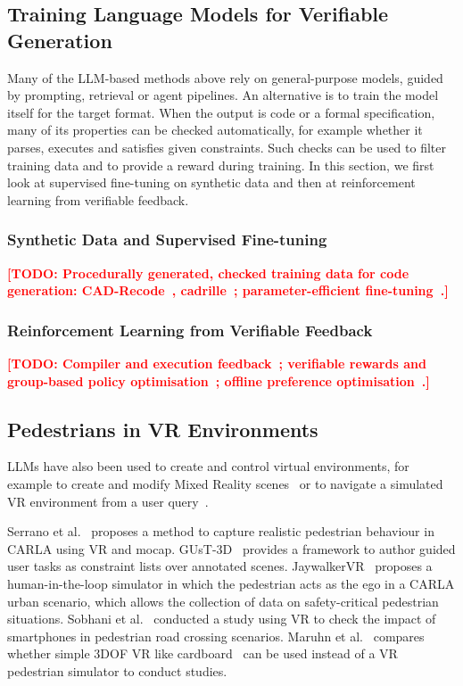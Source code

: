 \documentclass[preprint,12pt]{elsarticle}
\newcommand{\todo}[1]{\textcolor{red}{\textbf{[TODO: #1]}}}
\begin{document}
\subsection{Training Language Models for Verifiable Generation}
Many of the LLM-based methods above rely on general-purpose models, guided by prompting, retrieval or agent pipelines. An alternative is to train the model itself for the target format. When the output is code or a formal specification, many of its properties can be checked automatically, for example whether it parses, executes and satisfies given constraints. Such checks can be used to filter training data and to provide a reward during training. In this section, we first look at supervised fine-tuning on synthetic data and then at reinforcement learning from verifiable feedback.

\subsubsection{Synthetic Data and Supervised Fine-tuning}
\todo{Procedurally generated, checked training data for code generation: CAD-Recode~\cite{rukhovich2024cadrecode}, cadrille~\cite{kolodiazhnyi2026cadrille}; parameter-efficient fine-tuning~\cite{hu2021lora}.}

\subsubsection{Reinforcement Learning from Verifiable Feedback}
\todo{Compiler and execution feedback~\cite{wang2022compcoder,gehring2024rlef}; verifiable rewards and group-based policy optimisation~\cite{shao2024deepseekmath,guo2025deepseekr1,liu2025drgrpo,lambert2024tulu3}; offline preference optimisation~\cite{rafailov2023dpo}.}

\subsection{Pedestrians in VR Environments}
LLMs have also been used to create and control virtual environments, for example to create and modify Mixed Reality scenes~\cite{delatorre2023llmr} or to navigate a simulated VR environment from a user query~\cite{qin2026navai}.

Serrano et al.~\cite{serrano2023carlavr} proposes a method to capture  realistic pedestrian behaviour in CARLA using VR and mocap. GUsT-3D~\cite{wu2022gust3d} provides a framework to author guided user tasks as constraint lists over annotated scenes. JaywalkerVR~\cite{mukoya2024jaywalkervr} proposes a human-in-the-loop simulator in which the pedestrian acts as the ego in a CARLA urban scenario, which allows the collection of data on safety-critical pedestrian situations. Sobhani et al.~\cite{sobhani2017distracted} conducted a study using VR to check the impact of smartphones in pedestrian road crossing scenarios.  Maruhn et al.~\cite{maruhn2021vrpedestrian} compares whether simple 3DOF VR like cardboard~\cite{todo} can be used instead of a VR pedestrian simulator  to conduct studies. 
\end{document}

